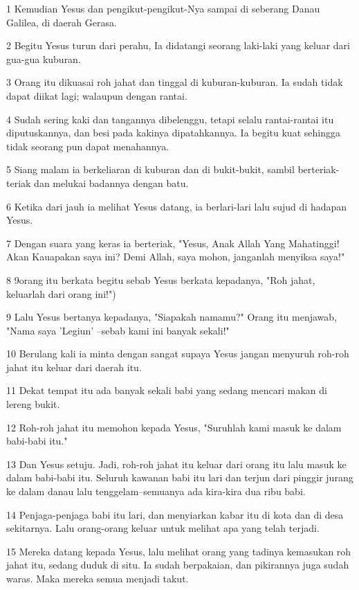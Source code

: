 \par 1 Kemudian Yesus dan pengikut-pengikut-Nya sampai di seberang Danau Galilea, di daerah Gerasa.
\par 2 Begitu Yesus turun dari perahu, Ia didatangi seorang laki-laki yang keluar dari gua-gua kuburan.
\par 3 Orang itu dikuasai roh jahat dan tinggal di kuburan-kuburan. Ia sudah tidak dapat diikat lagi; walaupun dengan rantai.
\par 4 Sudah sering kaki dan tangannya dibelenggu, tetapi selalu rantai-rantai itu diputuskannya, dan besi pada kakinya dipatahkannya. Ia begitu kuat sehingga tidak seorang pun dapat menahannya.
\par 5 Siang malam ia berkeliaran di kuburan dan di bukit-bukit, sambil berteriak-teriak dan melukai badannya dengan batu.
\par 6 Ketika dari jauh ia melihat Yesus datang, ia berlari-lari lalu sujud di hadapan Yesus.
\par 7 Dengan suara yang keras ia berteriak, "Yesus, Anak Allah Yang Mahatinggi! Akan Kauapakan saya ini? Demi Allah, saya mohon, janganlah menyiksa saya!"
\par 8 9orang itu berkata begitu sebab Yesus berkata kepadanya, "Roh jahat, keluarlah dari orang ini!")
\par 9 Lalu Yesus bertanya kepadanya, "Siapakah namamu?" Orang itu menjawab, "Nama saya 'Legiun' --sebab kami ini banyak sekali!"
\par 10 Berulang kali ia minta dengan sangat supaya Yesus jangan menyuruh roh-roh jahat itu keluar dari daerah itu.
\par 11 Dekat tempat itu ada banyak sekali babi yang sedang mencari makan di lereng bukit.
\par 12 Roh-roh jahat itu memohon kepada Yesus, "Suruhlah kami masuk ke dalam babi-babi itu."
\par 13 Dan Yesus setuju. Jadi, roh-roh jahat itu keluar dari orang itu lalu masuk ke dalam babi-babi itu. Seluruh kawanan babi itu lari dan terjun dari pinggir jurang ke dalam danau lalu tenggelam--semuanya ada kira-kira dua ribu babi.
\par 14 Penjaga-penjaga babi itu lari, dan menyiarkan kabar itu di kota dan di desa sekitarnya. Lalu orang-orang keluar untuk melihat apa yang telah terjadi.
\par 15 Mereka datang kepada Yesus, lalu melihat orang yang tadinya kemasukan roh jahat itu, sedang duduk di situ. Ia sudah berpakaian, dan pikirannya juga sudah waras. Maka mereka semua menjadi takut.
